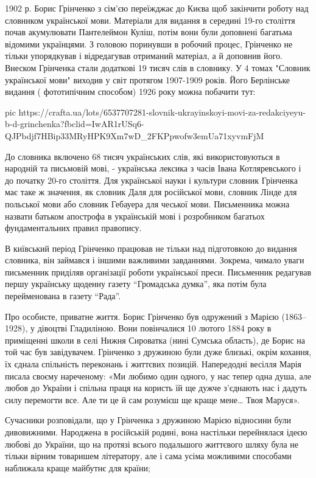 1902 р. Борис Грінченко з сім'єю переїжджає до Києва щоб закінчити роботу над
словником української мови. Матеріали для видання в середині 19-го століття
почав акумулювати Пантелеймон Куліш, потім вони були доповнені багатьма
відомими українцями. З головою поринувши в робочий процес, Грінченко не тільки
упорядкував і відредагував отриманий матеріал, а й доповнив його. Внеском
Грінченка стали додаткові 19 тисяч слів в словнику. У 4 томах "Словник
української мови" виходив у світ протягом 1907-1909 років. Його Берлінське
видання ( фототипічним способом) 1926 року можна побачити тут:

\ifcmt
pic https://crafta.ua/lots/6537707281-slovnik-ukrayinskoyi-movi-za-redakciyeyu-b-d-grinchenka?fbclid=IwAR1rUSq6-QJPbdjf7HBip33MRyHPK9Xm7wD_2FKPpwofw3emUa71xyvmFjM
\fi

До словника включено 68 тисяч українських слів, які використовуються в народній
та письмовій мові, - українська лексика з часів Івана Котляревського і до
початку 20-го століття.  Для української науки і культури словник Грінченка має
таке ж значення, як словник Даля для російської мови, словник Лінде для
польської мови або словник Гебауера для чеської мови. Письменника можна назвати
батьком апострофа в українській мові і розробником багатьох фундаментальних
правил правопису.

В київський період Грінченко працював не тільки над підготовкою до видання
словника, він займався і іншими важливими завданнями. Зокрема, чимало уваги
письменник приділяв організації роботи української преси. Письменник редагував
першу українську щоденну газету \enquote{Громадська думка}, яка потім була
перейменована в газету \enquote{Рада}.

Про особисте, приватне життя. Борис Грінченко був одружений з Марією
(1863–1928), у дівоцтві Гладиліною. Вони повінчалися 10 лютого 1884 року в
приміщенні школи в селі Нижня Сироватка (нині Сумська область), де Борис на той
час був завідувачем. Грінченко з дружиною були дуже близькі, окрім кохання, їх
єднала спільність переконань і життєвих позицій. Напередодні весілля Марія
писала своєму нареченому: «Ми любимо один одного, у нас тепер одна душа, але
любов до України і спільна праця на користь їй ще дужче з'єднають нас і дадуть
силу перемогти все. Але ти це й сам розумієш ще краще мене… Твоя Маруся».


Сучасники розповідали, що у Грінченка з дружиною Марією відносини були
дивовижними. Народжена в російській родині, вона настільки перейнялася ідеєю
любові до України, що на протязі всього подальшого життєвого шляху була не
тільки вірним товаришем літератору, але і сама усіма можливими способами
наближала краще майбутнє для країни;

